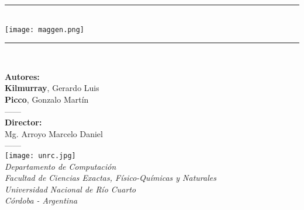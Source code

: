 \newcommand{\HRule}{\rule{\linewidth}{0.6mm}}
\begin{titlepage}

\begin{center}


\vspace*{2cm}

  {\Large{\textbf{}}}
\vspace*{0.3cm}
\HRule \\
  \vspace*{0.6cm}
{\centering \texttt{[image: maggen.png]}}
 
\HRule \\[0.5cm]

\vspace*{1.4cm}

\large{\textbf{Autores:}\\ \textbf{Kilmurray}, Gerardo Luis\\ \textbf{Picco}, Gonzalo Martín\\}
\vspace*{0.4cm}
{------\\}
\vspace*{0.4cm}
\large{\textbf{Director:}\\ Mg. Arroyo Marcelo Daniel\\}
\vspace*{1cm}
{------\\}
\vspace*{1.7cm}
 \texttt{[image: unrc.jpg]}\\
\vspace*{0.4cm}
\normalsize{\textit{Departamento de Computación\\
                    Facultad de Ciencias Exactas, Físico-Químicas y Naturales\\
                    Universidad Nacional de Río Cuarto\\
                    Córdoba - Argentina}}
\end{center}
\end{titlepage}
\sloppy

\titlepage
